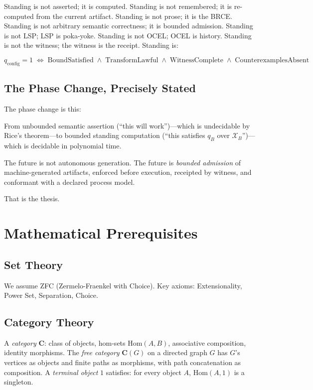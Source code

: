 \documentclass[12pt, letterpaper]{report}
\theoremstyle{plain}
\theoremstyle{definition}
\theoremstyle{remark}
\newcommand{\qc}{q_{\mathrm{config}}}
\begin{document}
\medskip
Standing is not asserted; it is computed.
Standing is not remembered; it is re-computed from the current artifact.
Standing is not prose; it is the BRCE.
Standing is not arbitrary semantic correctness; it is bounded admission.
Standing is not LSP; LSP is poka-yoke.
Standing is not OCEL; OCEL is history.
Standing is not the witness; the witness is the receipt.
Standing is:

\begin{equation}
  \boxed{
    \qc = 1 \;\iff\;
    \mathrm{BoundSatisfied}
    \;\wedge\;
    \mathrm{TransformLawful}
    \;\wedge\;
    \mathrm{WitnessComplete}
    \;\wedge\;
    \mathrm{CounterexamplesAbsent}
  }
\end{equation}

\section{The Phase Change, Precisely Stated}

The phase change is this:

From unbounded semantic assertion (``this will work'')---which is undecidable
by Rice's theorem---to bounded standing computation (``this satisfies $q_B$
over $\mathcal{X}_B$'')---which is decidable in polynomial time.

The future is not autonomous generation.
The future is \emph{bounded admission} of machine-generated artifacts,
enforced before execution, receipted by witness, and
conformant with a declared process model.

That is the thesis.

\appendix

\chapter{Mathematical Prerequisites}
\label{app:prereqs}

\section{Set Theory}
We assume ZFC (Zermelo-Fraenkel with Choice).
Key axioms: Extensionality, Power Set, Separation, Choice.

\section{Category Theory}
A \emph{category} $\mathbf{C}$: class of objects, hom-sets $\mathrm{Hom}(A,B)$,
associative composition, identity morphisms.
The \emph{free category} $\mathbf{C}(G)$ on a directed graph $G$ has $G$'s
vertices as objects and finite paths as morphisms, with path concatenation
as composition.
A \emph{terminal object} $1$ satisfies: for every object $A$,
$\mathrm{Hom}(A, 1)$ is a singleton.
\end{document}
